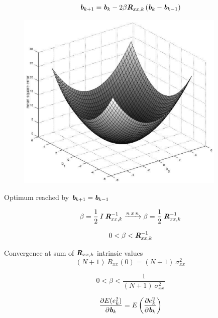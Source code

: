\documentclass[
    10pt, %
    DIV12,
    english, %
    a5paper, %
    twoside, %
    titlepage, %
    parskip=half, %
    headings=small, %
    listof=totoc, %
    bibliography=totoc, %
    index=totoc, %
    captions=tableheading, %
    final %
]{scrbook}
\begin{document}
\begin{equation}
\textit{\textbf{b}}_{k+1}=\textit{\textbf{b}}_k-2\beta \textit{\textbf{R}}_{xx,k}\left(\textit{\textbf{b}}_k-\textit{\textbf{b}}_{k-1}\right)\nonumber
\end{equation}

\begin{figure}[H]
\centering
\includegraphics[width=10cm]{../Images/mse.pdf}
\end{figure}

Optimum reached by $\textit{\textbf{b}}_{k+1} = \textit{\textbf{b}}_{k-1}$

\begin{equation}
\beta=\frac{1}{2}\:I\:\textit{\textbf{R}}_{xx,k}^{-1} \xrightarrow{n\:x\:n} \beta=\frac{1}{2}\:\textit{\textbf{R}}_{xx,k}^{-1}\nonumber
\end{equation}

\begin{equation}
0 < \beta < \textit{\textbf{R}}_{xx,k}^{-1} \nonumber
\end{equation}

Convergence at sum of $\textit{\textbf{R}}_{xx,k}$  intrinsic values 
\begin{equation}
(N+1)\:R_{xx}(0)=(N+1)\:\sigma_{xx}^2\nonumber
\end{equation}

\begin{equation}
0 < \beta < \frac{1}{(N+1)\:\sigma_{xx}^2} \nonumber
\end{equation}

\begin{equation}
\frac{\partial E(e_k^2)}{\partial \textit{\textbf{b}}_k}=E\left(\frac{\partial e_k^2}{\partial \textit{\textbf{b}}_k}\right)\nonumber
\end{equation}
\end{document}
